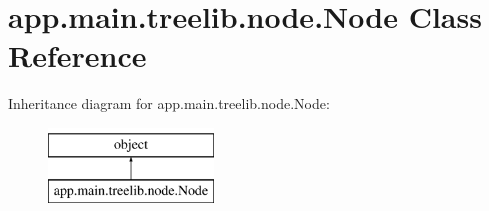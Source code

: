 \hypertarget{classapp_1_1main_1_1treelib_1_1node_1_1Node}{}\section{app.\+main.\+treelib.\+node.\+Node Class Reference}
\label{classapp_1_1main_1_1treelib_1_1node_1_1Node}
Inheritance diagram for app.\+main.\+treelib.\+node.\+Node\+:\begin{figure}[H]
\begin{center}
\leavevmode
\includegraphics[height=2.000000cm]{classapp_1_1main_1_1treelib_1_1node_1_1Node}
\end{center}
\end{figure}
